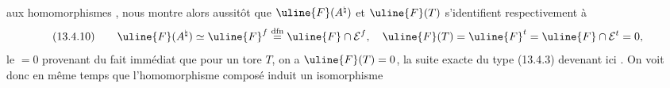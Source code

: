 aux homomorphismes
,
\margin{$\unsure{=}$}
nous montre alors aussitôt que $\uline{F}(A^\natural)$ et $\uline{F}(T)$ s'identifient respectivement à
\[
(13.4.10)\qquad\uline{F}(A^\natural)\simeq\uline{F}^{f}\overset{\mathrm{dfn}}=\uline{F}\cap\mathcal E^{f},\quad\uline{F}(T)=\uline{F}^{t}=\uline{F}\cap\mathcal E^{t}=0,
\]
le $=0$ provenant du fait immédiat que pour un tore $T$, on a $\uline{F}(T)=0$,
la suite exacte du type (13.4.3) devenant ici
.
On voit donc en même temps que l'homomorphisme composé
\margin{$\unsure{-}$}
induit un isomorphisme

